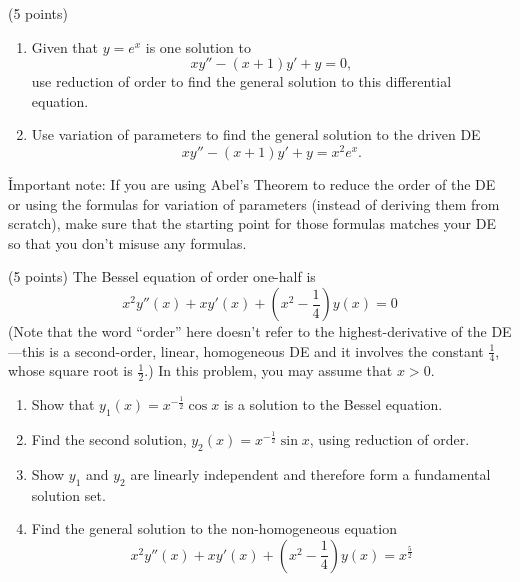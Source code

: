 

\begin{problem}[1]
(5 points)

\begin{enumerate}
\item Given that $y = e^x$ is one solution to
\[xy'' -(x+1)y' +y = 0,\]
use reduction of order to find the general solution to this differential equation.
\item Use variation of parameters to find the general solution to the driven DE 
\[xy'' -(x+1)y' +y=x^2 e^x.\]
\end{enumerate}

\v{Important note:} If you are using Abel’s Theorem to reduce the order of the DE or using the formulas for variation of parameters (instead of deriving them from scratch), make sure that the starting point for those formulas matches your DE so that you don’t misuse any formulas.
\end{problem}



\newpage


\begin{problem}[2]
(5 points) The Bessel equation of order one-half is
\[x^2y''(x)+xy'(x)+\left(x^2 - \frac 14 \right)y(x) = 0\]
 (Note that the word “order” here doesn’t refer to the highest-derivative of the DE—this is a second-order, linear, homogeneous DE and it involves the constant $\frac 14$, whose square root is $\frac 12$.) In this problem, you may assume that $x > 0$.


\begin{enumerate}
\item Show that $y_1(x) = x^{- \frac 12} \cos x$ is a solution to the Bessel equation.
\item Find the second solution, $y_2(x) = x^{-\frac 12} \sin x$, using reduction of order.
\item Show $y_1$ and $y_2$ are linearly independent and therefore form a fundamental solution set.
\item Find the general solution to the non-homogeneous equation
\[x^2y''(x)+xy'(x)+\left(x^2 - \frac 14 \right)y(x) = x^{\frac 52}\]
\end{enumerate}
\end{problem}


